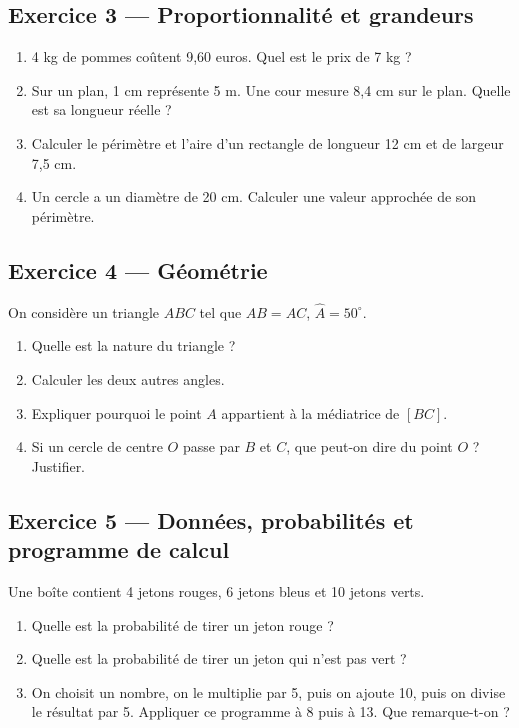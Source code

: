 \documentclass[11pt,a4paper]{article}
\begin{document}
\subsection*{Exercice 3 — Proportionnalité et grandeurs}
\begin{enumerate}[label=\arabic*)]
\item 4 kg de pommes coûtent 9,60 euros. Quel est le prix de 7 kg ?
\item Sur un plan, 1 cm représente 5 m. Une cour mesure 8,4 cm sur le plan. Quelle est sa longueur réelle ?
\item Calculer le périmètre et l'aire d'un rectangle de longueur 12 cm et de largeur 7,5 cm.
\item Un cercle a un diamètre de 20 cm. Calculer une valeur approchée de son périmètre.
\end{enumerate}

\subsection*{Exercice 4 — Géométrie}
On considère un triangle \(ABC\) tel que \(AB=AC\), \(\widehat{A}=50^\circ\).
\begin{enumerate}[label=\arabic*)]
\item Quelle est la nature du triangle ?
\item Calculer les deux autres angles.
\item Expliquer pourquoi le point \(A\) appartient à la médiatrice de \([BC]\).
\item Si un cercle de centre \(O\) passe par \(B\) et \(C\), que peut-on dire du point \(O\) ? Justifier.
\end{enumerate}

\subsection*{Exercice 5 — Données, probabilités et programme de calcul}
Une boîte contient 4 jetons rouges, 6 jetons bleus et 10 jetons verts.
\begin{enumerate}[label=\arabic*)]
\item Quelle est la probabilité de tirer un jeton rouge ?
\item Quelle est la probabilité de tirer un jeton qui n'est pas vert ?
\item On choisit un nombre, on le multiplie par 5, puis on ajoute 10, puis on divise le résultat par 5. Appliquer ce programme à 8 puis à 13. Que remarque-t-on ?
\end{enumerate}
\end{document}
